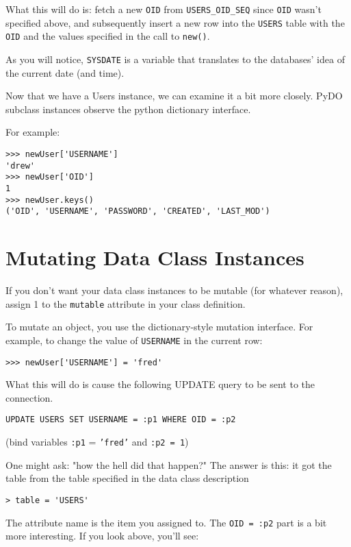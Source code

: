 \documentclass[titlepage]{manual}
\begin{document}
What this will do is: fetch a new \texttt{OID} from
\texttt{USERS_OID_SEQ} since \texttt{OID} wasn't specified above, and
subsequently insert a new row into the \texttt{USERS} table with the
\texttt{OID} and the values specified in the call to \texttt{new()}.

As you will notice, \texttt{SYSDATE} is a variable that translates to
the databases' idea of the current date (and time).


Now that we have a Users instance, we can examine it a bit more
closely.  PyDO subclass instances observe the python dictionary
interface.

For example:

\begin{verbatim}
>>> newUser['USERNAME']
'drew'
>>> newUser['OID']
1
>>> newUser.keys()
('OID', 'USERNAME', 'PASSWORD', 'CREATED', 'LAST_MOD')
\end{verbatim}


\section{Mutating Data Class Instances}

If you don't want your data class instances to be mutable (for
whatever reason), assign 1 to the \texttt{mutable} attribute in your class
definition.

To mutate an object, you use the dictionary-style mutation interface.
For example, to change the value of \texttt{USERNAME} in the current row:
\begin{verbatim}
>>> newUser['USERNAME'] = 'fred'
\end{verbatim}

What this will do is cause the following UPDATE query to be sent to the
connection.

\begin{verbatim}
UPDATE USERS SET USERNAME = :p1 WHERE OID = :p2
\end{verbatim}
(bind variables \texttt{:p1} = \texttt{'fred'} and \texttt{:p2 = 1})

One might ask: "how the hell did that happen?"  The answer is this:
it got the table from the table specified in the data class
description

\begin{verbatim}
> table = 'USERS'
\end{verbatim}

The attribute name is the item you assigned to.  The \texttt{OID =
:p2} part is a bit more interesting.  If you look above, you'll see:
\end{document}

